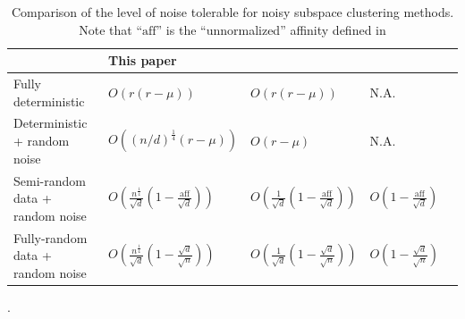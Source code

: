 \documentclass[main]{subfiles}
\begin{document}


\begin{table}
\centering
\small{
\begin{tabular}{|p{2.2in}|p{1.05in}|p{1in}|p{1in}|p{1.2in}|}
  \hline
   & This paper & \cite{wang2013noisy} & \cite{soltanolkotabi2013robust} \\\hline %
  Fully deterministic & $O(r(r-\mu))$ & $O(r(r-\mu))$ & N.A.  \\\hline
  Deterministic + random noise & $O((n/d)^{\frac{1}{4}}(r-\mu))$ & $O(r-\mu)$ & N.A.   \\\hline
  Semi-random data + random noise & $O\left(\frac{n^{\frac{1}{4}}}{\sqrt{d}}(1-\frac{\text{aff}}{\sqrt{d}})\right)$ & $O\left(\frac{1}{\sqrt{d}}(1-\frac{\text{aff}}{\sqrt{d}})\right)$ & $O\left(1-\frac{\text{aff}}{\sqrt{d}}\right)$  \\\hline
    Fully-random data + random noise & $O\left(\frac{n^{\frac{1}{4}}}{\sqrt{d}}(1-\frac{\sqrt{d}}{\sqrt{n}})\right)$ & $O\left(\frac{1}{\sqrt{d}}(1-\frac{\sqrt{d}}{\sqrt{n}})\right)$ & $O\left(1-\frac{\sqrt{d}}{\sqrt{n}}\right)$  \\
  \hline
\end{tabular}
}
\caption{Comparison of the level of noise tolerable for noisy subspace clustering methods. Note that ``$\mathrm{aff}$'' is the ``unnormalized'' affinity defined in \cite{soltanolkotabi2011geometric}}.\label{tab:comparison}
\end{table}
\end{document}
